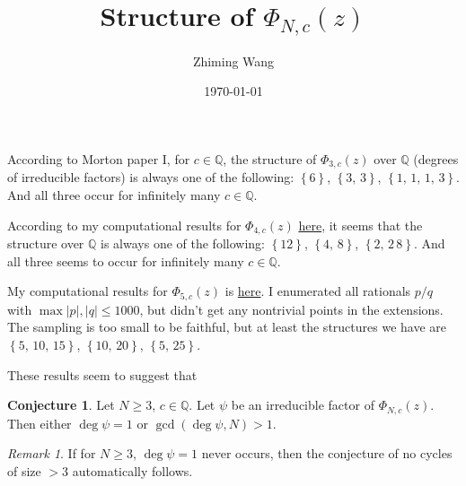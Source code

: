 \documentclass{amsart}
\title{Structure of $\Phi_{N,c}(z)$}
\author{Zhiming Wang}
\date{\today}
\theoremstyle{plain}
\theoremstyle{definition}
\newtheorem{conjecture}[theorem]{Conjecture}
\theoremstyle{remark}
\newtheorem{remark}[theorem]{Remark}
\newcommand{\Q}{\mathbb{Q}}
\newcommand{\set}[1]{\left\{#1\right\}}
\begin{document}
\maketitle

According to Morton paper I, for $c \in \Q$, the structure of
$\Phi_{3,c}(z)$ over $\Q$ (degrees of irreducible factors) is always
one of the following: $\set{6}$, $\set{3,\, 3}$, $\set{1,\, 1,\, 1,\,
  3}$. And all three occur for infinitely many $c \in \Q$.

According to my computational results for $\Phi_{4, c}(z)$
\href{http://goo.gl/wgS3dn}{here}, it seems that the structure over
$\Q$ is always one of the following: $\set{12}$, $\set{4,\, 8}$,
$\set{2,\, 2\, 8}$. And all three seems to occur for infinitely many
$c \in \Q$.

My computational results for $\Phi_{5, c}(z)$ is
\href{http://goo.gl/dqjs8q}{here}. I enumerated all rationals $p/q$
with $\max{|p|, |q|} \le 1000$, but didn't get any nontrivial points
in the extensions. The sampling is too small to be faithful, but at
least the structures we have are $\set{5,\, 10,\, 15}$, $\set{10,\,
  20}$, $\set{5,\, 25}$.

These results seem to suggest that

\begin{conjecture}
  Let $N \ge 3$, $c \in \Q$. Let $\psi$ be an irreducible factor of
  $\Phi_{N, c}(z)$. Then either $\deg \psi = 1$ or $\gcd(\deg \psi, N)
  > 1$.
\end{conjecture}

\begin{remark}
  If for $N \ge 3$, $\deg \psi = 1$ never occurs, then the conjecture
  of no cycles of size $>3$ automatically follows.
\end{remark}
\end{document}
